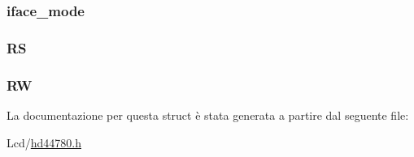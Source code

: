 \hypertarget{struct_h_d44780___l_c_d__t_a7c5a51b8cc5de5ee2cf42b884bd1bc67}{
\subsubsection[{iface\+\_\+mode}]{ iface\+\_\+mode}}\label{struct_h_d44780___l_c_d__t_a7c5a51b8cc5de5ee2cf42b884bd1bc67}
\hypertarget{struct_h_d44780___l_c_d__t_a142ae0db638dca7ab42e2183a1311d32}{
\subsubsection[{R\+S}]{ R\+S}}\label{struct_h_d44780___l_c_d__t_a142ae0db638dca7ab42e2183a1311d32}
\hypertarget{struct_h_d44780___l_c_d__t_af8225e4a125a2159215dfa03372c305f}{
\subsubsection[{R\+W}]{ R\+W}}\label{struct_h_d44780___l_c_d__t_af8225e4a125a2159215dfa03372c305f}


La documentazione per questa struct è stata generata a partire dal seguente file\+:\begin{DoxyCompactItemize}
\item 
Lcd/\hyperlink{hd44780_8h}{hd44780.\+h}\end{DoxyCompactItemize}
